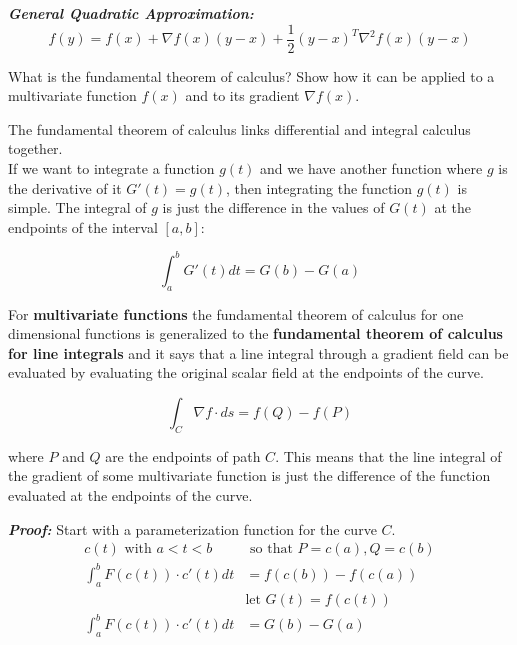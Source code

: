 \documentclass[12pt,a4paper]{article}
\begin{document}
\textbf{\textit{General Quadratic Approximation:}}
\begin{equation*}
    f(y) = f(x) + \nabla f(x)(y-x) + \frac{1}{2} (y-x)^T \nabla ^2 f(x)(y-x)
\end{equation*}



\begin{question}
What is the fundamental theorem of calculus? Show how it can be applied
to a multivariate function $f(x)$ and to its gradient $\nabla f(x)$.
\end{question}

The fundamental theorem of calculus links differential and integral calculus together.\\
If we want to integrate a function $g(t)$ and we have another function where $g$ is the derivative of it $G'(t) = g(t)$, then integrating the function $g(t)$ is simple. The integral of $g$ is just the difference in the values of $G(t)$ at the endpoints of the interval $[a, b]$:

\begin{equation*}
    \int_a^b G'(t)dt = G(b) - G(a)
\end{equation*}

For \textbf{multivariate functions} the fundamental theorem of calculus for one dimensional functions is generalized to the \textbf{fundamental theorem of calculus for line integrals} and it says that a line integral through a gradient field can be evaluated by evaluating the original scalar field at the endpoints of the curve.

\begin{equation*}
    \int_C \nabla f \cdot ds = f(Q) - f(P)
\end{equation*}

where $P$ and $Q$ are the endpoints of path $C$.
This means that the line integral of the gradient of some multivariate function is just the difference of the function evaluated at the endpoints of the curve.

\textbf{\textit{Proof:}} Start with a parameterization function for the curve $C$.
\begin{align}
    c(t) \text{ with } a < t < b &\text{ so that } P = c(a), Q = c(b)\\
    \int_a^b F(c(t)) \cdot c'(t) dt &= f(c(b)) - f(c(a))\\
    &\text{let } G(t) = f(c(t))\\
    \int_a^b F(c(t)) \cdot c'(t) dt &= G(b) - G(a)
\end{align}
\end{document}
